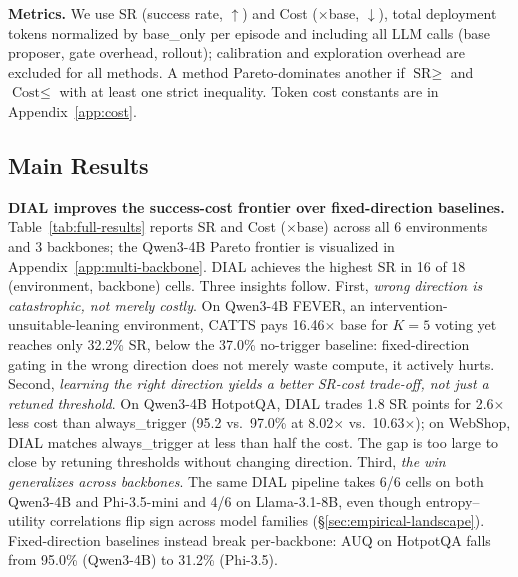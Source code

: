 
\vspace{-0.025in}
\textbf{Metrics.} We use SR (success rate, $\uparrow$) and Cost
($\times$base, $\downarrow$), total deployment tokens normalized by
base\_only per episode and including all LLM calls (base proposer, gate
overhead, rollout); calibration and exploration overhead are excluded
for all methods. A method Pareto-dominates another if
$\text{SR}\geq$ and $\text{Cost}\leq$ with at least one strict inequality.
Token cost constants are in Appendix~\ref{app:cost}.
\vspace{-0.15in}
\subsection{Main Results}
\label{sec:main-results}
\vspace{-0.1in}


\textbf{DIAL improves the success-cost frontier over fixed-direction baselines.}
Table~\ref{tab:full-results} reports SR and Cost ($\times$base) across all 6 environments and 3 backbones; the Qwen3-4B Pareto frontier is visualized in Appendix~\ref{app:multi-backbone}. DIAL
achieves the highest SR in 16 of 18 (environment, backbone) cells. Three insights follow.
First, \emph{wrong direction is catastrophic, not merely costly}.
On Qwen3-4B FEVER, an intervention-unsuitable-leaning environment, CATTS pays 16.46$\times$ base for $K{=}5$ voting yet reaches only 32.2\% SR, below the 37.0\% no-trigger baseline: fixed-direction gating in the wrong direction
does not merely waste compute, it actively hurts.
Second, \emph{learning the right direction yields a better SR-cost trade-off, not just a retuned threshold}. On Qwen3-4B HotpotQA, DIAL trades 1.8 SR points for 2.6$\times$ less cost than always\_trigger (95.2 vs.\ 97.0\% at 8.02$\times$ vs.\ 10.63$\times$); on WebShop, DIAL matches always\_trigger at less than half the cost. The gap is too large
to close by retuning thresholds without changing direction.
Third, \emph{the win generalizes across backbones}. The same DIAL pipeline takes 6/6 cells on both Qwen3-4B and Phi-3.5-mini and 4/6 on Llama-3.1-8B, even though entropy--utility correlations flip sign across model families (\S\ref{sec:empirical-landscape}). Fixed-direction baselines instead break per-backbone: AUQ on HotpotQA falls from 95.0\% (Qwen3-4B) to 31.2\% (Phi-3.5).



